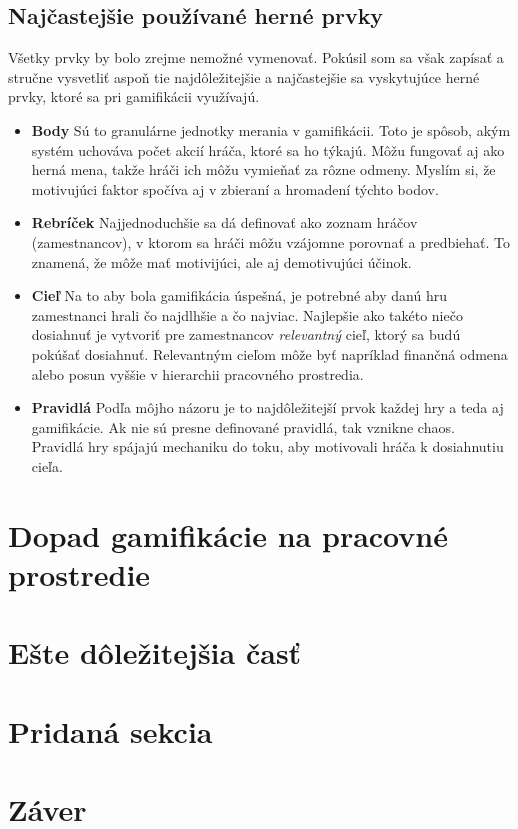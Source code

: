 \documentclass{article}
\begin{document}
\subsection{Najčastejšie používané herné prvky} 
Všetky prvky by bolo zrejme nemožné vymenovať. Pokúsil som sa však zapísať a stručne vysvetliť aspoň tie najdôležitejšie a najčastejšie sa vyskytujúce herné prvky, ktoré sa pri gamifikácii využívajú.
\begin{itemize}
\item \textbf{Body} 
Sú to granulárne jednotky merania v gamifikácii. Toto je spôsob, akým systém uchováva počet akcií hráča, ktoré sa ho týkajú\cite{10.1007/978-3-642-39241-2_58}. Môžu fungovať aj ako herná mena, takže hráči ich môžu vymieňať za rôzne odmeny. Myslím si, že motivujúci faktor spočíva aj v zbieraní a hromadení týchto bodov.
\item \textbf{Rebríček}
Najjednoduchšie sa dá definovať ako zoznam hráčov (zamestnancov), v ktorom sa hráči môžu vzájomne porovnať a predbiehať. To znamená, že môže mať motivijúci, ale aj demotivujúci účinok.
\item \textbf{Cieľ}
Na to aby bola gamifikácia úspešná, je potrebné aby danú hru zamestnanci hrali čo najdlhšie a čo najviac. Najlepšie ako takéto niečo dosiahnuť je vytvoriť pre zamestnancov \textit{relevantný} cieľ, ktorý sa budú pokúšať dosiahnuť. Relevantným cieľom môže byť napríklad finančná odmena alebo posun vyššie v hierarchii pracovného prostredia.
\item \textbf{Pravidlá}
Podľa môjho názoru je to najdôležitejší prvok každej hry a teda aj gamifikácie. Ak nie sú presne definované pravidlá, tak vznikne chaos.
\\Pravidlá hry spájajú mechaniku do toku, aby motivovali hráča k dosiahnutiu cieľa\cite{10.1007/978-3-642-39241-2_58}.
\end{itemize}

\section{Dopad gamifikácie na pracovné prostredie} \label{dopad}




\section{Ešte dôležitejšia časť} \label{dolezitejsia}

\section{Pridaná sekcia}


\section{Záver} \label{zaver} %






\end{document}
